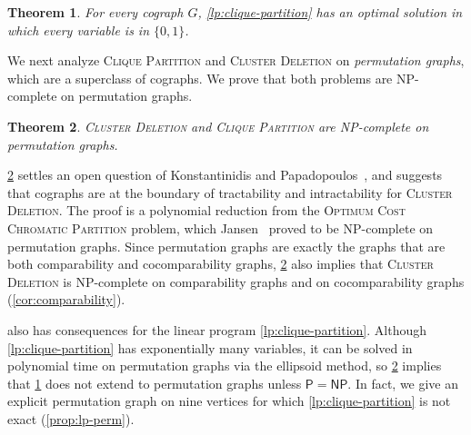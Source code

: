 \documentclass[a4paper,fleqn]{cas-sc}
\newtheorem{thm}{Theorem}[section]
\theoremstyle{remark}
\theoremstyle{plain}
\newcommand{\defn}[1]{\emph{#1}}
\newcommand{\cd}{\textsc{Cluster Deletion}}
\newcommand{\cp}{\textsc{Clique Partition}}
\newcommand{\occp}{\textsc{Optimum Cost Chromatic Partition}}
\newcommand{\greedy}{{\textsc{Greedy}}}
\newcommand{\sg}{{\textsc{Smart Greedy}}}
\begin{document}
\begin{thm} \label{thm:cograph-lp}
For every cograph $G$, \eqref{lp:clique-partition} has an optimal
solution in which every variable is in $\{0,1\}$.
\end{thm}

We next analyze \cp{} and \cd{} on \defn{permutation graphs}, which are a superclass of cographs. We prove that both problems are NP-complete on permutation graphs.

\begin{thm} \label{thm:NPhardness}
    \cd{} and \cp{} are NP-complete on permutation graphs.
\end{thm}

\cref{thm:NPhardness} settles an open question of Konstantinidis and Papadopoulos~\cite{konstantinidis2021cluster}, and suggests that cographs are at the boundary of tractability and intractability for \cd{}. The proof is a polynomial reduction from the \occp{} problem, which Jansen~\cite{JANSEN200054} proved to be NP-complete on permutation graphs.  Since permutation graphs are exactly the graphs that are both comparability and cocomparability graphs, \cref{thm:NPhardness} also implies that \cd{} is NP-complete on comparability graphs and on cocomparability graphs (\cref{cor:comparability}). 

 also has consequences for the linear program \eqref{lp:clique-partition}.  Although \eqref{lp:clique-partition} has exponentially many variables, it can be solved in polynomial time on permutation graphs via the ellipsoid method, so \cref{thm:NPhardness} implies that \cref{thm:cograph-lp} does not extend to permutation graphs unless $\mathsf{P}=\mathsf{NP}$.  In fact, we give an explicit permutation graph on nine vertices for which \eqref{lp:clique-partition} is not exact (\cref{prop:lp-perm}).








  
\end{document}
